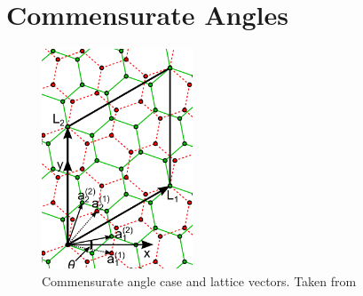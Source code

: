 \documentclass[a4paper,12pt]{report}
\begin{document}
%

\section{Commensurate Angles}

\begin{figure}[H]
\centering
\includegraphics[width=0.4\textwidth]{fig/latvec.png}
\caption{Commensurate angle case and lattice vectors. Taken from \cite{koshino2012}}
\label{fig:latvec}
\end{figure}
\end{document}
